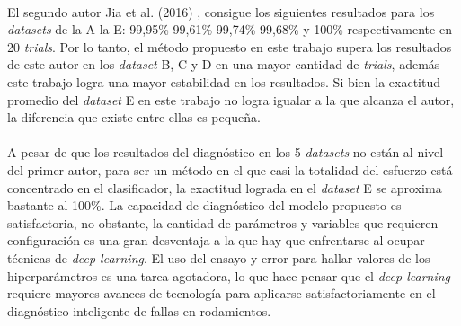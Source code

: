 \documentclass[12pt]{article}
\begin{document}
\paragraph{}
El segundo autor Jia et al. (2016) \cite{jia}, consigue los siguientes resultados para los \textit{datasets} de la A la E: 99,95\% 99,61\% 99,74\% 99,68\% y 100\% respectivamente en 20 \textit{trials}. Por lo tanto, el método propuesto en este trabajo supera los resultados de este autor en los \textit{dataset} B, C y D en una mayor cantidad de \textit{trials}, además este trabajo logra una mayor estabilidad en los resultados. Si bien la exactitud promedio del \textit{dataset} E en este trabajo no logra igualar a la que alcanza el autor, la diferencia que existe entre ellas es pequeña.

\paragraph{}
A pesar de que los resultados del diagnóstico en los 5 \textit{datasets} no están al nivel del primer autor, para ser un método en el que casi la totalidad del esfuerzo está concentrado en el clasificador, la exactitud lograda en el \textit{dataset} E se aproxima bastante al 100\%. La capacidad de diagnóstico del modelo propuesto es satisfactoria, no obstante, la cantidad de parámetros y variables que requieren configuración es una gran desventaja a la que hay que enfrentarse al ocupar técnicas de \textit{deep learning}. El uso del ensayo y error para hallar valores de los hiperparámetros es una tarea agotadora, lo que hace pensar que el \textit{deep learning} requiere mayores avances de tecnología para aplicarse satisfactoriamente en el diagnóstico inteligente de fallas en rodamientos.
\end{document}
